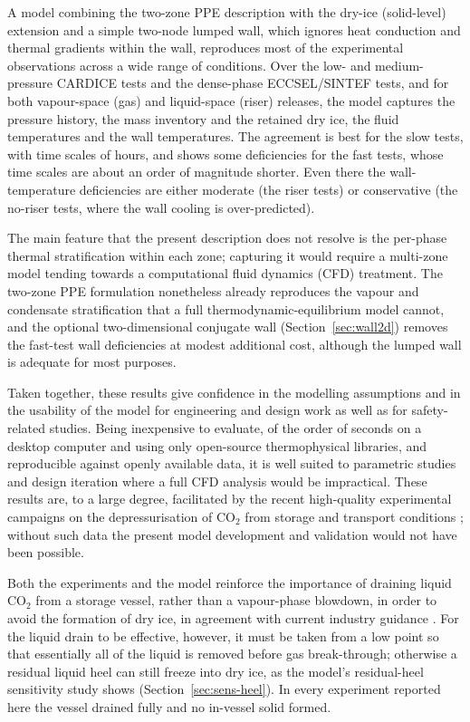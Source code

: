 \documentclass[5p,authoryear]{elsarticle}
\begin{document}
A model combining the two-zone PPE description
with the dry-ice (solid-level) extension and a simple two-node lumped wall, which ignores heat
conduction and thermal gradients within the wall, reproduces most of the experimental observations
across a wide range of conditions. Over the low- and medium-pressure CARDICE tests and the
dense-phase ECCSEL/SINTEF tests, and for both vapour-space (gas) and liquid-space (riser) releases, the
model captures the pressure history, the mass inventory and the retained dry ice, the fluid
temperatures and the wall temperatures. The agreement is best for the slow tests, with time scales
of hours, and shows some deficiencies for the fast tests, whose time scales are about an order of
magnitude shorter. Even there the wall-temperature deficiencies are either moderate (the riser
tests) or conservative (the no-riser tests, where the wall cooling is over-predicted).

The main feature that the present description does not resolve is the per-phase thermal
stratification within each zone; capturing it would require a multi-zone model tending towards a
computational fluid dynamics (CFD) treatment. The two-zone PPE formulation nonetheless already
reproduces the vapour and condensate stratification that a full thermodynamic-equilibrium model
cannot, and the optional two-dimensional conjugate wall (Section~\ref{sec:wall2d}) removes the
fast-test wall deficiencies at modest additional cost, although the lumped wall is adequate for most
purposes.

Taken together, these results give confidence in the modelling assumptions and in the usability of
the model for engineering and design work as well as for safety-related studies. Being inexpensive
to evaluate, of the order of seconds on a desktop computer and using only open-source thermophysical
libraries, and reproducible against openly available data, it is well suited to parametric studies
and design iteration where a full CFD analysis would be impractical. These results are, to a large
degree, facilitated by the recent high-quality experimental campaigns on the depressurisation of
CO$_2$ from storage and transport conditions \citep{CardiceData2025, HoydalsvikData2026}; without such
data the present model development and validation would not have been possible.

Both the experiments and the model reinforce the importance of draining liquid CO$_2$ from a storage
vessel, rather than a vapour-phase blowdown, in order to avoid the formation of dry ice, in
agreement with current industry guidance \citep{eiga66_2022, eiga164_2020}. For the liquid drain to be effective,
however, it must be taken from a low point so that essentially all of the liquid is removed before
gas break-through; otherwise a residual liquid heel can still freeze into dry ice, as the model's
residual-heel sensitivity study shows (Section~\ref{sec:sens-heel}). In every experiment reported
here the vessel drained fully and no in-vessel solid formed.
\end{document}
